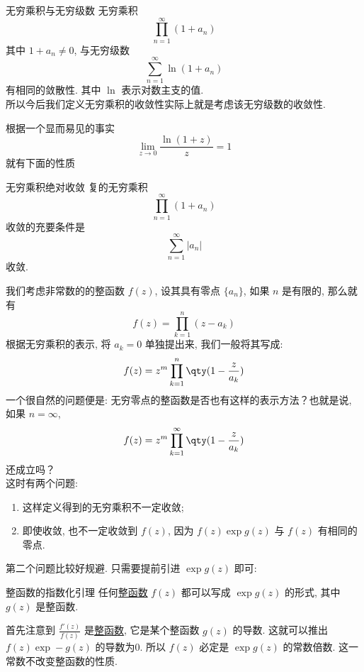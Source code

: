 \documentclass[UTF8]{ctexart}
\begin{document}
        \begin{ppt}
            {无穷乘积与无穷级数}
            无穷乘积
            \[\prod_{n=1}^{\infty}(1+a_n)\]
            其中 \(1+a_n\neq 0\), 与无穷级数
            \[\sum_{n=1}^\infty\ln(1+a_n)\]
            有相同的敛散性. 其中 \(\ln\) 表示对数主支的值. \\
            所以今后我们定义无穷乘积的收敛性实际上就是考虑该无穷级数的收敛性. 
        \end{ppt}

        根据一个显而易见的事实
        \[\lim_{z\to 0}\frac{\ln(1+z)}{z}=1\]
        就有下面的性质

        \begin{ppt}
            {无穷乘积绝对收敛}
            复的无穷乘积
            \[\prod_{n=1}^{\infty}(1+a_n)\]
            收敛的充要条件是
            \[\sum_{n=1}^\infty|a_n|\]
            收敛. 
        \end{ppt}

        我们考虑非常数的的整函数 \(f(z)\), 设其具有零点 \(\{a_n\}\), 如果 \(n\) 是有限的, 那么就有
        \[f(z)=\prod_{k=1}^{n}(z-a_k)\]
        根据无穷乘积的表示, 将 \(a_k=0\) 单独提出来, 我们一般将其写成: 
        \[f(z)=z^m\prod_{k=1}^{n}\qty(1-\frac{z}{a_k})\]
        一个很自然的问题便是: 无穷零点的整函数是否也有这样的表示方法？也就是说, 如果 \(n=\infty\), 
        \[f(z)=z^m\prod_{k=1}^{\infty}\qty(1-\frac{z}{a_k})\]
        还成立吗？\\
        这时有两个问题: 
        
        \begin{enumerate}
            \item 这样定义得到的无穷乘积不一定收敛; 
            \item 即使收敛, 也不一定收敛到 \(f(z)\), 因为 \(f(z)\exp g(z)\) 与 \(f(z)\) 有相同的零点. 
        \end{enumerate}

        第二个问题比较好规避. 只需要提前引进 \(\exp g(z)\) 即可: 

        \begin{lma}
            {整函数的指数化引理}
            任何\hyperref[dfn:EntireFunction]{整函数} \(f(z)\) 都可以写成 \(\exp g(z)\) 的形式, 其中 \(g(z)\) 是整函数.
        \end{lma}

        \begin{prf}
            首先注意到 \(\frac{f'(z)}{f(z)}\) 是\hyperref[dfn:EntireFunction]{整函数}, 它是某个整函数 \(g(z)\) 的导数. 这就可以推出 \(f(z)\exp -g(z)\) 的导数为0. 所以 \(f(z)\) 必定是 \(\exp g(z)\) 的常数倍数. 这一常数不改变整函数的性质. 
        \end{prf}
\end{document}
